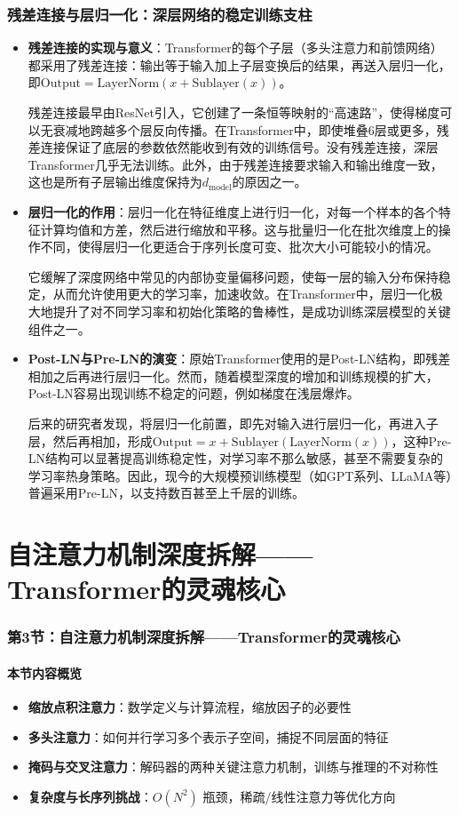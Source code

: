 \documentclass[11pt]{beamer}
\begin{document}
\begin{frame}
\frametitle{残差连接与层归一化：深层网络的稳定训练支柱}
\begin{itemize}
    \item \textbf{残差连接的实现与意义}：Transformer的每个子层（多头注意力和前馈网络）都采用了\alert{残差连接}：输出等于输入加上子层变换后的结果，再送入层归一化，即\(\text{Output} = \text{LayerNorm}(x + \text{Sublayer}(x))\)。
    
    残差连接最早由ResNet引入，它创建了一条\alert{恒等映射的“高速路”}，使得梯度可以无衰减地跨越多个层反向传播。在Transformer中，即使堆叠6层或更多，残差连接保证了底层的参数依然能收到有效的训练信号。没有残差连接，深层Transformer几乎无法训练。此外，由于残差连接要求输入和输出维度一致，这也是所有子层输出维度保持为\(d_{\text{model}}\)的原因之一。

    \item \textbf{层归一化的作用}：层归一化在\alert{特征维度}上进行归一化，对每一个样本的各个特征计算均值和方差，然后进行缩放和平移。这与批量归一化在批次维度上的操作不同，使得层归一化更适合于序列长度可变、批次大小可能较小的情况。
    
    它缓解了深度网络中常见的\alert{内部协变量偏移}问题，使每一层的输入分布保持稳定，从而允许使用更大的学习率，加速收敛。在Transformer中，层归一化极大地提升了对不同学习率和初始化策略的鲁棒性，是成功训练深层模型的关键组件之一。

    \item \textbf{Post-LN与Pre-LN的演变}：原始Transformer使用的是\alert{Post-LN}结构，即残差相加之后再进行层归一化。然而，随着模型深度的增加和训练规模的扩大，Post-LN容易出现训练不稳定的问题，例如梯度在浅层爆炸。
    
    后来的研究者发现，将层归一化\alert{前置}，即先对输入进行层归一化，再进入子层，然后再相加，形成\(\text{Output} = x + \text{Sublayer}(\text{LayerNorm}(x))\)，这种\alert{Pre-LN}结构可以显著提高训练稳定性，对学习率不那么敏感，甚至不需要复杂的学习率热身策略。因此，现今的大规模预训练模型（如GPT系列、LLaMA等）普遍采用Pre-LN，以支持数百甚至上千层的训练。
\end{itemize}
\end{frame}

\section{自注意力机制深度拆解——Transformer的灵魂核心}

\begin{frame}
\frametitle{第3节：自注意力机制深度拆解——Transformer的灵魂核心}
\framesubtitle{本节内容概览}
\begin{itemize}
  \item \textbf{缩放点积注意力}：数学定义与计算流程，\alert{缩放因子}的必要性
  \item \textbf{多头注意力}：如何并行学习多个表示子空间，捕捉不同层面的特征
  \item \textbf{掩码与交叉注意力}：解码器的两种关键注意力机制，训练与推理的不对称性
  \item \textbf{复杂度与长序列挑战}：$O(N^2)$ 瓶颈，稀疏/线性注意力等优化方向
\end{itemize}
\end{frame}
\end{document}
